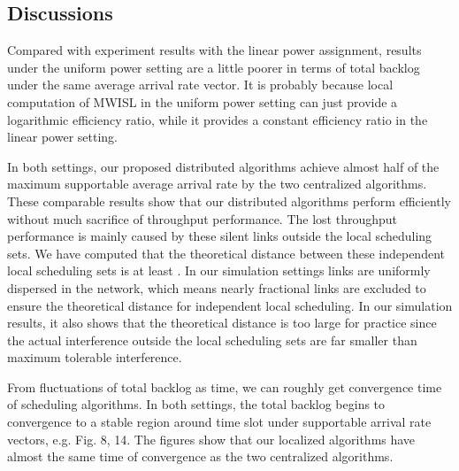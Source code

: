 \documentclass[journal]{IEEEtran}
\begin{document}
\subsection{Discussions }
Compared with experiment results with the linear power assignment, results under the uniform power setting are a little poorer in terms of total backlog under the same average arrival rate vector. It is probably because local computation of MWISL in the uniform power setting can just provide a logarithmic efficiency ratio, while it provides a constant efficiency ratio in the linear power setting.

In both settings, our proposed distributed algorithms achieve almost half of the maximum supportable average arrival rate by the two centralized algorithms. These comparable results show that our distributed algorithms perform efficiently without much sacrifice of throughput performance. The lost throughput performance is mainly caused by these silent links outside the local scheduling sets.  We have computed that the theoretical distance  between these independent local scheduling sets is at least . In our simulation settings links are uniformly dispersed in the network, which means nearly  fractional links are excluded to ensure the theoretical distance for independent local scheduling. In our simulation results, it also shows that the theoretical distance is too large for practice since the actual interference outside the local scheduling sets are far smaller than maximum tolerable interference.

From fluctuations of total backlog as time, we can roughly get  convergence time of scheduling algorithms. In both settings, the total backlog begins to convergence to a stable region around time slot  under supportable arrival rate vectors, e.g. Fig. 8, 14. The figures show that our localized algorithms have almost the same time of convergence as the two centralized algorithms.
\end{document}
